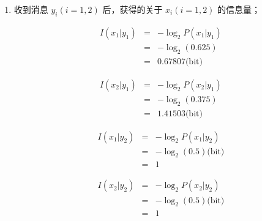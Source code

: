 \documentclass[onecolumn,oneside]{BUPTHomework}
\begin{document}
\begin{solution}
{\begin{enumerate}
      \begin{eqnarray} 
        P(x_1 \vert y_2) &=& \frac{P(x_1)P(y_2 \vert x_1)}{\sum_{j=1}^2P(x_j)P(y_2 \vert x_j)} \nonumber \\
        &=& \frac{0.6 \times \frac{1}{6}}{0.6 \times \frac{1}{6} + 0.4 \times \frac{1}{4}} \nonumber \\
        &=& 0.5 \nonumber
      \end{eqnarray}

      \begin{eqnarray} 
        P(x_2 \vert y_2) &=& \frac{P(x_2)P(y_2 \vert x_2)}{\sum_{j=1}^2P(x_j)P(y_2 \vert x_j)} \nonumber \\
        &=& \frac{0.4 \times \frac{1}{4}}{0.6 \times \frac{1}{6} + 0.4 \times \frac{1}{4}} \nonumber \\
        &=& 0.5 \nonumber
      \end{eqnarray}
      
      \item 收到消息 $y_i(i=1,2)$ 后，获得的关于 $x_i(i=1,2)$ 的信息量；
      
      \begin{eqnarray} 
        I(x_1 \vert y_1) &=& -\log_2P(x_1 \vert y_1) \nonumber \\
        &=& -\log_2(0.625) \nonumber \\
        &=& 0.67807 \mbox{(bit)} \nonumber
      \end{eqnarray}
      
      \begin{eqnarray} 
        I(x_2 \vert y_1) &=& -\log_2P(x_2 \vert y_1) \nonumber \\
        &=& -\log_2(0.375) \nonumber \\
        &=& 1.41503 \mbox{(bit)} \nonumber
      \end{eqnarray}

      \begin{eqnarray} 
        I(x_1 \vert y_2) &=& -\log_2P(x_1 \vert y_2) \nonumber \\
        &=& -\log_2(0.5) \mbox{(bit)} \nonumber \\
        &=& 1 \nonumber
      \end{eqnarray}

      \begin{eqnarray} 
        I(x_2 \vert y_2) &=& -\log_2P(x_2 \vert y_2) \nonumber \\
        &=& -\log_2(0.5) \mbox{(bit)} \nonumber \\
        &=& 1 \nonumber
      \end{eqnarray}


\end{enumerate}}
\end{solution}
\end{document}
